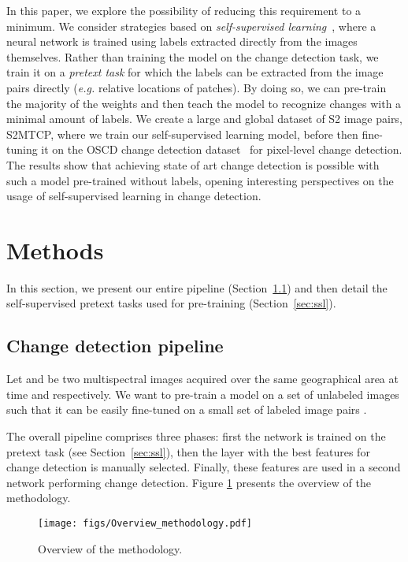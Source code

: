 \documentclass[runningheads]{llncs}
\begin{document}
In this paper, we explore the possibility of reducing this requirement to a minimum. We consider strategies based on \emph{self-supervised learning}~\cite{Doersch:2015:self-supervised_spatial_context,Caron:2018:self-supervised_clustering}, where a neural network is trained using labels extracted directly from the images themselves. Rather than training the model on the change detection task, we train it on a \emph{pretext task} for which the labels can be extracted from the image pairs directly (\emph{e.g.} relative locations of patches). By doing so, we can pre-train the majority of the weights and then teach the model to recognize changes with a minimal amount of labels. We create a large and global dataset of S2 image pairs, S2MTCP, where we train our self-supervised learning model, before then fine-tuning it on the OSCD change detection dataset~\cite{Daudt:2018:OSCD_CD_dataset} for pixel-level change detection. The results show that achieving state of art change detection is possible with such a model pre-trained without labels, opening interesting perspectives on the usage of self-supervised learning in change detection.


\section{Methods}
In this section, we present our entire pipeline (Section~\ref{sec:overall}) and then detail the self-supervised pretext tasks used for pre-training (Section~\ref{sec:ssl}). 


\subsection{Change detection pipeline}\label{sec:overall}
Let  and   be two multispectral images acquired over the same geographical area at time  and  respectively. 
We want to pre-train a model on a set of unlabeled images { such that it can be} easily fine-tuned on a {small} set of labeled image pairs .

The overall pipeline comprises three phases: first the network is trained on the pretext task (see Section~\ref{sec:ssl}), then the layer with the best features for change detection is manually selected. Finally, these features are used in a second network performing  change detection. Figure \ref{fig:methodology} presents the overview of the methodology. 

\begin{figure}
\texttt{[image: figs/Overview\_methodology.pdf]}
\caption{Overview of the methodology.} \label{fig:methodology}
\end{figure}
\end{document}
